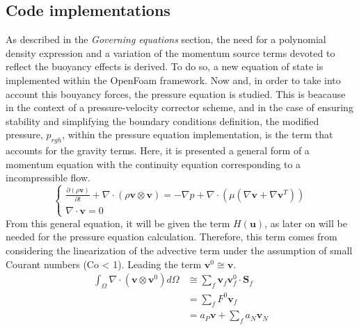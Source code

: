 \subsection{Code implementations}
As described in the \textit{Governing equations} section, the need for a polynomial density expression and a variation of the momentum source terms devoted to reflect the buoyancy effects is derived.
To do so, a new equation of state is implemented within the OpenFoam framework. Now and, in order to take into account this bouyancy forces, the pressure equation is studied. This is beacause in the context of a pressure-velocity corrector scheme, and in the case of ensuring stability and simplifying the boundary conditions definition, the modified pressure, \textit{$p_{rgh}$}, within the pressure equation implementation, is the term that accounts for the gravity terms.
\newline
Here, it is presented a general form of a momentum equation with the continuity equation corresponding to a incompressible flow.  
\begin{equation}
\left\{\begin{array}{l}
\frac{\partial (\rho \textbf{v})}{\partial t}+\nabla \cdot(\rho \textbf{v} \otimes \textbf{v})=-\nabla p+ \nabla \cdot(\mu (\nabla \textbf{v}+\nabla \textbf{v}^{T})) \\
\nabla \cdot \textbf{v}=0
\end{array}\right.
	\label{3.13}
\end{equation}
From this general equation, it will be given the term $H(\textbf{u})$, as later on will be needed for the pressure equation calculation.
\newline
Therefore, this term comes from considering the linearization of the advective term under the assumption of small Courant numbers (Co < 1). Leading the term $\textbf{v}^{0}\cong\textbf{v}$. 
\begin{equation}
\begin{aligned}
\int_{\Omega} \nabla \cdot\left(\textbf{v} \otimes \textbf{v}^{0}\right) d \Omega & \cong \sum_{f} \textbf{v}_{f} \textbf{v}_{f}^{0} \cdot \textbf{S}_{f} \\
&=\sum_{f} F^{0} \textbf{v}_{f} \\
&=a_{P} \textbf{v}+\sum_{f} a_{N} \textbf{v}_{N}
\end{aligned}
\label{3.14}
\end{equation}

